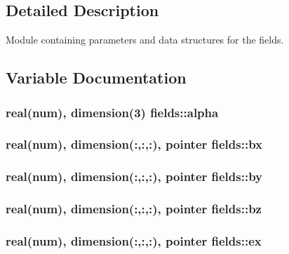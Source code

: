 \subsection{Detailed Description}
Module containing parameters and data structures for the fields. 

\subsection{Variable Documentation}
\subsubsection[{\texorpdfstring{alpha}{alpha}}]{\setlength{\rightskip}{0pt plus 5cm}real(num), dimension(3) fields\+::alpha}\hypertarget{namespacefields_a123e475dfb74b9d51f0cefd3aa32f4ef}{}\label{namespacefields_a123e475dfb74b9d51f0cefd3aa32f4ef}
\subsubsection[{\texorpdfstring{bx}{bx}}]{\setlength{\rightskip}{0pt plus 5cm}real(num), dimension(\+:,\+:,\+:), pointer fields\+::bx}\hypertarget{namespacefields_ae5c4690c74e129bc786b6880e43e5263}{}\label{namespacefields_ae5c4690c74e129bc786b6880e43e5263}
\subsubsection[{\texorpdfstring{by}{by}}]{\setlength{\rightskip}{0pt plus 5cm}real(num), dimension(\+:,\+:,\+:), pointer fields\+::by}\hypertarget{namespacefields_a945637961cd81816fb389b3aff1bcdc6}{}\label{namespacefields_a945637961cd81816fb389b3aff1bcdc6}
\subsubsection[{\texorpdfstring{bz}{bz}}]{\setlength{\rightskip}{0pt plus 5cm}real(num), dimension(\+:,\+:,\+:), pointer fields\+::bz}\hypertarget{namespacefields_aaf0c4459b6c5caf1375fef4b33801e86}{}\label{namespacefields_aaf0c4459b6c5caf1375fef4b33801e86}
\subsubsection[{\texorpdfstring{ex}{ex}}]{\setlength{\rightskip}{0pt plus 5cm}real(num), dimension(\+:,\+:,\+:), pointer fields\+::ex}\hypertarget{namespacefields_a4b459092bf44b6c1e18d38c5b67ffdd8}{}\label{namespacefields_a4b459092bf44b6c1e18d38c5b67ffdd8}
